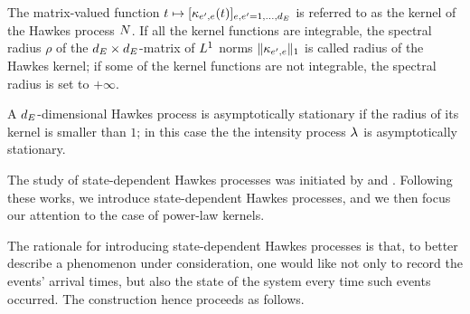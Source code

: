 \documentclass[10pt]{article}
\begin{document}
The matrix-valued function $t\mapsto [\hawkesKernel\subscriptee(t)]_{e,\eone = 1, \dots, \numEventTypes}$ is referred to as the kernel of the Hawkes process $\multiCountingProc$.  If all the kernel functions are integrable, the spectral radius $\rho$ of the $\numEventTypes\times\numEventTypes$-matrix of $\Lone$ norms $\Vert \hawkesKernel\subscriptee \Vert_{1}$ is called radius of the Hawkes kernel; if some of the kernel functions are not integrable, the spectral radius is set to $+\infty$.  

A $\numEventTypes$-dimensional Hawkes process is asymptotically stationary if the radius of its kernel is smaller than $1$; in this case the the intensity process $\intensity[ ]$ is asymptotically stationary.  


The study of state-dependent Hawkes processes was initiated by \cite{MP20hyb} and \cite{MP18sta}. Following these works, we introduce state-dependent Hawkes  processes, and we then focus our attention to the case of power-law kernels.

The rationale for introducing state-dependent Hawkes processes is that, to better describe a phenomenon under consideration, one would like not only to record the events' arrival times, but also the state of the system every time such events occurred. The construction hence proceeds as follows.
\end{document}
